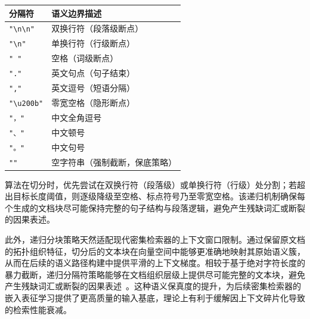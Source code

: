 \begin{table}[t]

\centering


\label{tab:chunking_separators}

\begin{tabular}{ll}

\toprule

\textbf{分隔符} & \textbf{语义边界描述} \\

\midrule

\texttt{"\textbackslash n\textbackslash n"} & 双换行符（段落级断点） \\

\texttt{"\textbackslash n"} & 单换行符（行级断点） \\

\texttt{" "} & 空格（词级断点） \\

\texttt{"."} & 英文句点（句子结束） \\

\texttt{","} & 英文逗号（短语分隔） \\

\texttt{"\textbackslash u200b"} & 零宽空格（隐形断点） \\

\texttt{"，"} & 中文全角逗号 \\

\texttt{"、"} & 中文顿号 \\

\texttt{"。"} & 中文句号 \\

\texttt{""} & 空字符串（强制截断，保底策略） \\

\bottomrule

\end{tabular}

\end{table}



算法在切分时，优先尝试在双换行符（段落级）或单换行符（行级）处分割；若超出目标长度阈值，则逐级降级至空格、标点符号乃至零宽空格。该递归机制确保每个生成的文档块尽可能保持完整的句子结构与段落逻辑，避免产生残缺词汇或断裂的因果表述。



此外，递归分块策略天然适配现代密集检索器的上下文窗口限制。通过保留原文档的拓扑组织特征，切分后的文本块在向量空间中能够更准确地映射其原始语义簇，从而在后续的语义路径构建中提供平滑的上下文梯度。相较于基于绝对字符长度的暴力截断，递归分隔符策略能够在文档组织层级上提供尽可能完整的文本块，避免产生残缺词汇或断裂的因果表述~\citep{Zhou2026BeyondCA}。这种语义保真度的提升，为后续密集检索器的嵌入表征学习提供了更高质量的输入基底，理论上有利于缓解因上下文碎片化导致的检索性能衰减。



